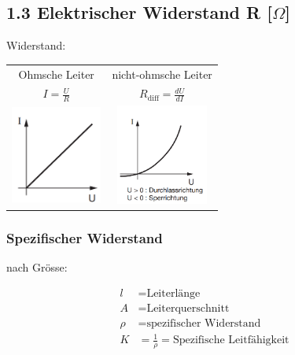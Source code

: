 \subsection*{1.3 Elektrischer Widerstand R [$\Omega$]}

Widerstand: 

\begin{tabular}{c c}
    Ohmsche Leiter & nicht-ohmsche Leiter \\
    $I = \frac{U}{R}$ & $R_{\text{diff}} = \frac{dU}{dI}$\\
    \includegraphics[width = 30mm]{src/images/plot_ohmscher_leiter.png} & \includegraphics[width = 30mm]{src/images/plot_nicht-ohmscher_leiter.png}
\end{tabular}
\vfill

\subsubsection*{Spezifischer Widerstand}
nach Grösse:

\vspace{-1mm}
\begin{minipage}{0.49\linewidth}
    \begin{footnotesize}
        \begin{center}
        \end{center}
    \end{footnotesize}
\end{minipage}
\begin{minipage}{0.5\linewidth}
    \begin{scriptsize}
        \begin{center}
            \begin{align*}
                l &= \text{Leiterlänge}
                \\A &= \text{Leiterquerschnitt} 
                \\\rho &= \text{spezifischer Widerstand}
                \\  K &= \frac{1}{\rho} = \text{Spezifische Leitfähigkeit}
            \end{align*}
        \end{center}
    \end{scriptsize}
\end{minipage}
\vspace{1mm}

